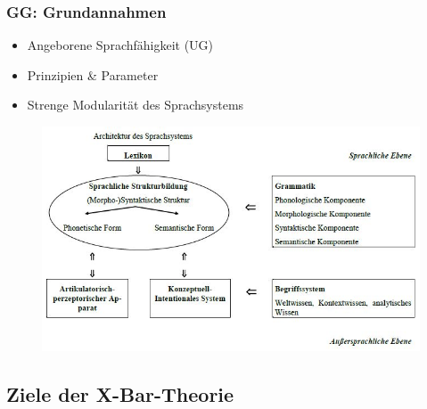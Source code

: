 \begin{frame}
\frametitle{GG: Grundannahmen}

\begin{itemize}
	\item Angeborene Sprachfähigkeit (UG)
	\item Prinzipien \& Parameter
	\item Strenge Modularität des Sprachsystems 
\end{itemize}

\begin{figure}
\centering

	\includegraphics[scale=.3]{material/03ArchitekturSprachsystem}
\end{figure}

\end{frame}


\subsection{Ziele der X-Bar-Theorie}


